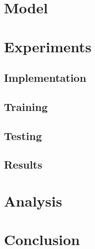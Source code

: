 \documentclass[hyperref, lof, lot, noproblem, masterofscience]{cgvpub}
\begin{document}
\chapter{Model}



\chapter{Experiments}

\section{Implementation}
\section{Training}
\section{Testing}
\section{Results}


\chapter{Analysis}



\chapter{Conclusion}
\end{document}
